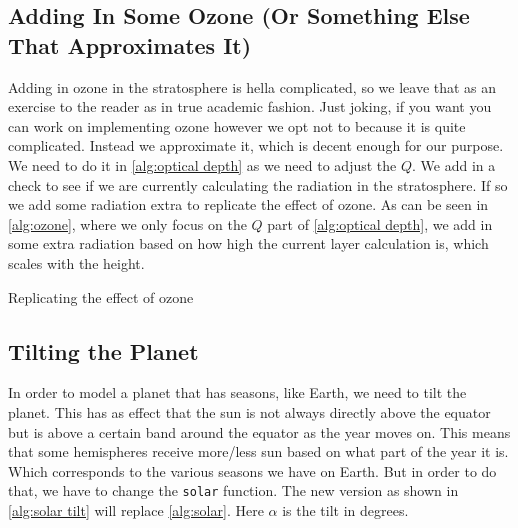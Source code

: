 \subsection{Adding In Some Ozone (Or Something Else That Approximates It)}
Adding in ozone in the stratosphere is hella complicated, so we leave that as an exercise to the reader as in true academic fashion. Just joking, if you want you can work on implementing ozone 
however we opt not to because it is quite complicated. Instead we approximate it, which is decent enough for our purpose. We need to do it in \autoref{alg:optical depth} as we need to adjust the
$Q$. We add in a check to see if we are currently calculating the radiation in the stratosphere. If so we add some radiation extra to replicate the effect of ozone. As can be seen in 
\autoref{alg:ozone}, where we only focus on the $Q$ part of \autoref{alg:optical depth}, we add in some extra radiation based on how high the current layer calculation is, which scales with the
height. 

\begin{algorithm}
    \caption{Replicating the effect of ozone}
    \label{alg:ozone}
\end{algorithm}

\subsection{Tilting the Planet}
In order to model a planet that has seasons, like Earth, we need to tilt the planet. This has as effect that the sun is not always directly above the equator but is above a certain band around
the equator as the year moves on. This means that some hemispheres receive more/less sun based on what part of the year it is. Which corresponds to the various seasons we have on Earth. But in
order to do that, we have to change the \texttt{solar} function. The new version as shown in \autoref{alg:solar tilt} will replace \autoref{alg:solar}. Here $\alpha$ is the tilt in degrees.

